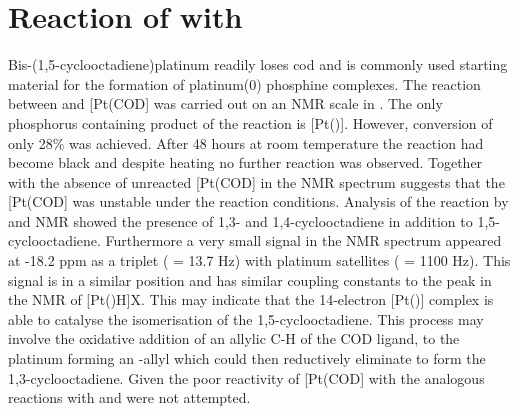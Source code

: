 \section{Reaction of \tButhixantphos{} with \texorpdfstring{} P}

Bis-(1,5-cyclooctadiene)platinum readily loses \gls{cod} and is commonly used starting material for the formation of platinum(0) phosphine complexes.  The reaction between \tButhixantphos{} and [Pt(COD] was carried out on an NMR scale in .  The only phosphorus containing product of the reaction is [Pt(\tButhixantphos)].  However, conversion of only 28\% was achieved.  After 48 hours at room temperature the reaction had become black and despite heating no further reaction was observed.  Together with the absence of unreacted [Pt(COD] in the \proton{} NMR spectrum suggests that the [Pt(COD] was unstable under the reaction conditions.  Analysis of the reaction by \proton{} and \carbon{} NMR showed the presence of 1,3- and 1,4-cyclooctadiene in addition to 1,5-cyclooctadiene.  Furthermore a very small signal in the \proton{} NMR spectrum appeared at -18.2 ppm as a triplet (\JPH{} = 13.7 Hz) with platinum satellites (\JPtH{} = 1100 Hz).  This signal is in a similar position and has similar coupling constants to the peak in the \proton{} NMR of [Pt(\tBuxantphos)H]X.  This may indicate that the 14-electron [Pt(\tButhixantphos)] complex is able to catalyse the isomerisation of the 1,5-cyclooctadiene.  This process may involve the oxidative addition of an allylic C-H of the COD ligand, to the platinum forming an -allyl which could then reductively eliminate to form the 1,3-cyclooctadiene.    Given the poor reactivity of [Pt(COD] with \tButhixantphos{} the analogous reactions with \tBusixantphos{} and \tBuxantphos{} were not attempted.  


